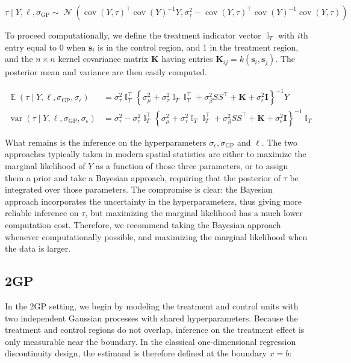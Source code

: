 \documentclass[letter]{article}
\newcommand{\genericdel}[3]{%
      \left#1#3\right#2
    }
\newcommand{\del}[1]{\genericdel(){#1}}
\newcommand{\cbr}[1]{\genericdel\{\}{#1}}
\DeclareMathOperator{\E}{\mathbb{E}}
\DeclareMathOperator{\cov}{{cov}}
\DeclareMathOperator{\var}{{var}}
\DeclareMathOperator{\Ind}{\mathbb{I}}
\DeclareMathOperator{\normal}{\mathcal{N}}
\newcommand{\trans}{^{\intercal}}
\newcommand{\sigmaf}{\sigma_{\mathrm{GP}}}
\newcommand{\sigman}{\sigma_{\epsilon}}
\newcommand{\sigmatau}{\sigma_{\tau}}
\newcommand{\sigmabeta}{\sigma_{\beta}}
\newcommand{\sigmamu}{\sigma_{\mu}}
\newcommand{\svec}{\mathbold{s}}
\newcommand{\vectreat}{\Ind_{T}}
\newcommand{\eye}{\mathbf{I}}
\newcommand{\K}{\mathbf{K}}
\begin{document}
\begin{equation}
    \tau \mid Y, \ell, \sigmaf \sim \normal\del{\cov\del{Y,\tau}\trans \cov\del{Y}^{-1} Y, \sigma_\tau^2 - \cov\del{Y,\tau}\trans \cov\del{Y}^{-1} \cov\del{Y,\tau}}
\end{equation}

To proceed computationally, we define the treatment indicator vector
\(\vectreat\) with \(i\)th entry equal to 0 when \(\svec_i\) is in the
control region, and 1 in the treatment region, and the \(n \times n\)
kernel covariance matrix \(\K\) having entries
\(\K_{ij}=k(\svec_i, \svec_j)\). The posterior mean and variance are
then easily computed.

\begin{equation}\begin{split}
    \E \del{\tau \mid Y, \ell, \sigmaf, \sigman} &= \sigmatau^2 \vectreat\trans \cbr{\sigmamu^2 + \sigmatau^2 \vectreat \vectreat\trans + \sigmabeta^2 S S\trans + \K + \sigman^2 \eye }^{-1} Y \\
    \var \del{\tau \mid Y, \ell, \sigmaf, \sigman} &= \sigma_\tau^2 - \sigma_\tau^2 \vectreat\trans \cbr{\sigmamu^2 + \sigmatau^2 \vectreat \vectreat\trans + \sigmabeta^2 S S\trans + \K + \sigman^2 \eye }^{-1} \vectreat
\end{split}\end{equation}

What remains is the inference on the hyperparameters
\(\sigman, \sigmaf\) and \(\ell\). The two approaches typically taken in
modern spatial statistics are either to maximize the marginal likelihood
of \(Y\) as a function of those three parameters, or to assign them a
prior and take a Bayesian approach, requiring that the posterior of
\(\tau\) be integrated over those parameters. The compromise is clear:
the Bayesian approach incorporates the uncertainty in the
hyperparameters, thus giving more reliable inference on \(\tau\), but
maximizing the marginal likelihood has a much lower computation cost.
Therefore, we recommend taking the Bayesian approach whenever
computationally possible, and maximizing the marginal likelihood when
the data is larger.
    


    	\subsection{2GP}\label{gp}

In the 2GP setting, we begin by modeling the treatment and control units
with two independent Gaussian processes with shared hyperparameters.
Because the treatment and control regions do not overlap, inference on
the treatment effect is only measurable near the boundary. In the
classical one-dimensional regression discontinuity design, the estimand
is therefore defined at the boundary \(x=b\):
\end{document}
